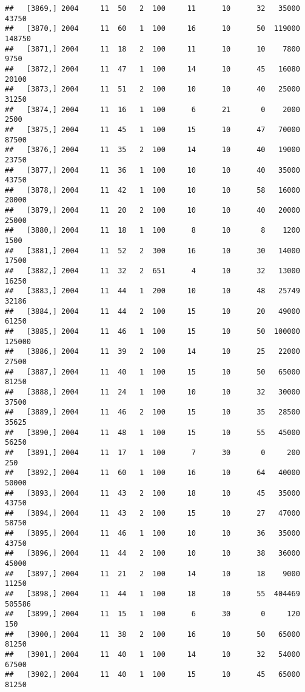 \documentclass{article}\usepackage[]{graphicx}\usepackage[]{color}
\makeatletter
\newenvironment{kframe}{%
 \def\at@end@of@kframe{}%
 \ifinner\ifhmode%
  \def\at@end@of@kframe{\end{minipage}}%
  \begin{minipage}{\columnwidth}%
 \fi\fi%
 \def\FrameCommand##1{\hskip\@totalleftmargin \hskip-\fboxsep
 \colorbox{shadecolor}{##1}\hskip-\fboxsep
     \hskip-\linewidth \hskip-\@totalleftmargin \hskip\columnwidth}%
 \MakeFramed {\advance\hsize-\width
   \@totalleftmargin\z@ \linewidth\hsize
   \@setminipage}}%
 {\par\unskip\endMakeFramed%
 \at@end@of@kframe}
\newenvironment{knitrout}{}{} %
\makeatother
\begin{document}
\begin{knitrout}
\begin{kframe}
\begin{verbatim}
##   [3869,] 2004     11  50   2  100     11      10      32   35000   43750
##   [3870,] 2004     11  60   1  100     16      10      50  119000  148750
##   [3871,] 2004     11  18   2  100     11      10      10    7800    9750
##   [3872,] 2004     11  47   1  100     14      10      45   16080   20100
##   [3873,] 2004     11  51   2  100     10      10      40   25000   31250
##   [3874,] 2004     11  16   1  100      6      21       0    2000    2500
##   [3875,] 2004     11  45   1  100     15      10      47   70000   87500
##   [3876,] 2004     11  35   2  100     14      10      40   19000   23750
##   [3877,] 2004     11  36   1  100     10      10      40   35000   43750
##   [3878,] 2004     11  42   1  100     10      10      58   16000   20000
##   [3879,] 2004     11  20   2  100     10      10      40   20000   25000
##   [3880,] 2004     11  18   1  100      8      10       8    1200    1500
##   [3881,] 2004     11  52   2  300     16      10      30   14000   17500
##   [3882,] 2004     11  32   2  651      4      10      32   13000   16250
##   [3883,] 2004     11  44   1  200     10      10      48   25749   32186
##   [3884,] 2004     11  44   2  100     15      10      20   49000   61250
##   [3885,] 2004     11  46   1  100     15      10      50  100000  125000
##   [3886,] 2004     11  39   2  100     14      10      25   22000   27500
##   [3887,] 2004     11  40   1  100     15      10      50   65000   81250
##   [3888,] 2004     11  24   1  100     10      10      32   30000   37500
##   [3889,] 2004     11  46   2  100     15      10      35   28500   35625
##   [3890,] 2004     11  48   1  100     15      10      55   45000   56250
##   [3891,] 2004     11  17   1  100      7      30       0     200     250
##   [3892,] 2004     11  60   1  100     16      10      64   40000   50000
##   [3893,] 2004     11  43   2  100     18      10      45   35000   43750
##   [3894,] 2004     11  43   2  100     15      10      27   47000   58750
##   [3895,] 2004     11  46   1  100     10      10      36   35000   43750
##   [3896,] 2004     11  44   2  100     10      10      38   36000   45000
##   [3897,] 2004     11  21   2  100     14      10      18    9000   11250
##   [3898,] 2004     11  44   1  100     18      10      55  404469  505586
##   [3899,] 2004     11  15   1  100      6      30       0     120     150
##   [3900,] 2004     11  38   2  100     16      10      50   65000   81250
##   [3901,] 2004     11  40   1  100     14      10      32   54000   67500
##   [3902,] 2004     11  40   1  100     15      10      45   65000   81250

\end{verbatim}
\end{kframe}
\end{knitrout}
\end{document}
